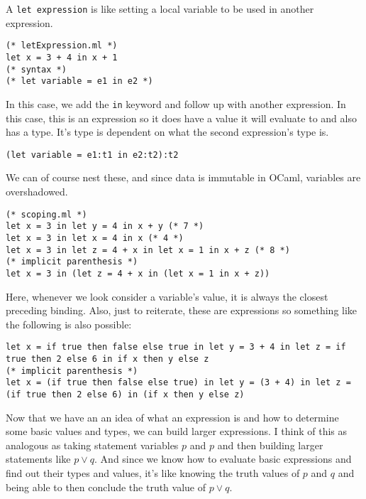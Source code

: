\documentclass[main.tex]{subfiles}
\begin{document}
A \texttt{let expression} is like setting a local variable to be used in another expression. 
\begin{lstlisting}[style=Myocamlstyle]
(* letExpression.ml *)
let x = 3 + 4 in x + 1
(* syntax *)
(* let variable = e1 in e2 *)
\end{lstlisting}
In this case, we add the \texttt{in} keyword and follow up with another expression. In this case, this is an expression so it does have a value it will evaluate to and also has a type. It's type is dependent on what the second expression's type is.
\begin{lstlisting}[style=Myocamlstyle]
(let variable = e1:t1 in e2:t2):t2
\end{lstlisting}
We can of course nest these, and since data is immutable in OCaml, variables are overshadowed. 
\begin{lstlisting}[style=Myocamlstyle]
(* scoping.ml *)
let x = 3 in let y = 4 in x + y (* 7 *)
let x = 3 in let x = 4 in x (* 4 *)
let x = 3 in let z = 4 + x in let x = 1 in x + z (* 8 *)
(* implicit parenthesis *)
let x = 3 in (let z = 4 + x in (let x = 1 in x + z))
\end{lstlisting}
Here, whenever we look consider a variable's value, it is always the closest preceding binding. 
Also, just to reiterate, these are expressions so something like the following is also possible:
\begin{lstlisting}[style=Myocamlstyle]
let x = if true then false else true in let y = 3 + 4 in let z = if true then 2 else 6 in if x then y else z
(* implicit parenthesis *)
let x = (if true then false else true) in let y = (3 + 4) in let z = (if true then 2 else 6) in (if x then y else z)
\end{lstlisting}

Now that we have an an idea of what an expression is and how to determine some basic values and types, we can build larger expressions. I think of this as analogous as taking statement variables $p$ and $p$ and then building larger statements like $p \lor q$. And since we know how to evaluate basic expressions and find out their types and values, it's like knowing the truth values of $p$ and $q$ and being able to then conclude the truth value of $p \lor q$. 
\end{document}
